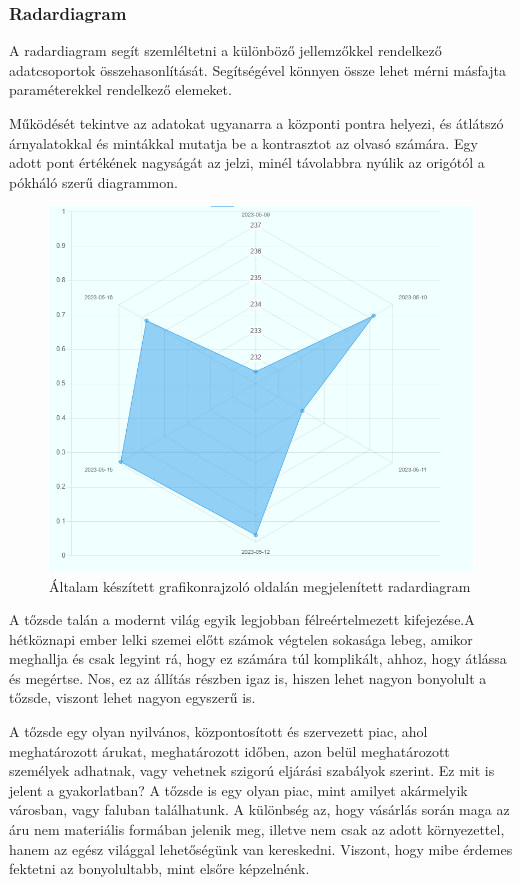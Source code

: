 \subsubsection{Radardiagram}

A radardiagram segít szemléltetni a különböző jellemzőkkel rendelkező adatcsoportok összehasonlítását. Segítségével könnyen össze lehet mérni másfajta paraméterekkel rendelkező elemeket. 

	Működését tekintve az adatokat ugyanarra a központi pontra helyezi, és átlátszó árnyalatokkal és mintákkal mutatja be a kontrasztot az olvasó számára. Egy adott pont értékének nagyságát az jelzi, minél távolabbra nyúlik az origótól a pókháló szerű diagrammon.

\begin{figure}[h]
\centering
\includegraphics[scale=0.4]{images/radarChartExample}
\caption{Általam készített grafikonrajzoló oldalán megjelenített radardiagram}
\end{figure}


A tőzsde talán a modernt világ egyik legjobban félreértelmezett kifejezése.A hétköznapi ember lelki szemei előtt számok végtelen sokasága lebeg, amikor meghallja és csak legyint rá, hogy ez számára túl komplikált, ahhoz, hogy átlássa és megértse. Nos, ez az állítás részben igaz is, hiszen lehet nagyon bonyolult a tőzsde, viszont lehet nagyon egyszerű is.

	A tőzsde egy olyan nyilvános, központosított és szervezett piac, ahol meghatározott árukat, meghatározott időben, azon belül meghatározott személyek adhatnak, vagy vehetnek szigorú eljárási szabályok szerint.  Ez mit is jelent a gyakorlatban? A tőzsde is egy olyan piac, mint amilyet akármelyik városban, vagy faluban találhatunk. A különbség az, hogy vásárlás során maga az áru nem materiális formában jelenik meg, illetve nem csak az adott környezettel, hanem az egész világgal lehetőségünk van kereskedni. Viszont, hogy mibe érdemes fektetni az bonyolultabb, mint elsőre képzelnénk. 
	
